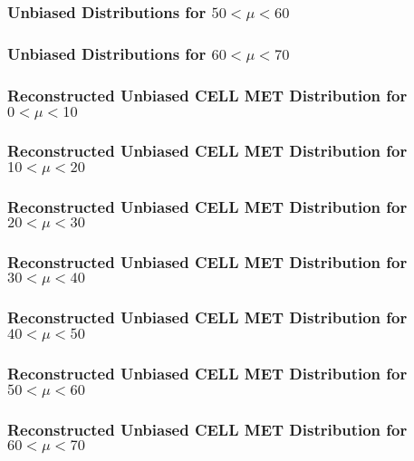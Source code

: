 \documentclass[]{beamer}
\begin{document}
\begin{frame}
        \frametitle{Unbiased Distributions for $50<\mu<60$}
\end{frame}
\begin{frame}
        \frametitle{Unbiased Distributions for $60<\mu<70$}
\end{frame}
\begin{frame}
        \frametitle{Reconstructed Unbiased CELL MET Distribution for $0<\mu<10$}
\end{frame}
\begin{frame}
        \frametitle{Reconstructed Unbiased CELL MET Distribution for $10<\mu<20$}
\end{frame}
\begin{frame}
        \frametitle{Reconstructed Unbiased CELL MET Distribution for $20<\mu<30$}
\end{frame}
\begin{frame}
        \frametitle{Reconstructed Unbiased CELL MET Distribution for $30<\mu<40$}
\end{frame}
\begin{frame}
        \frametitle{Reconstructed Unbiased CELL MET Distribution for $40<\mu<50$}
\end{frame}
\begin{frame}
        \frametitle{Reconstructed Unbiased CELL MET Distribution for $50<\mu<60$}
\end{frame}
\begin{frame}
        \frametitle{Reconstructed Unbiased CELL MET Distribution for $60<\mu<70$}
\end{frame}
\begin{frame}

\end{frame}
\end{document}
